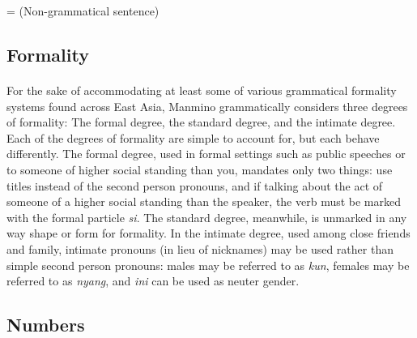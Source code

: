 \documentclass{book}
\begin{document}
        \hspace{.4in}= (Non-grammatical sentence)
        
        \vfill\newpage
        \subsection{Formality}
        \paragraph{} For the sake of accommodating at least some of various grammatical formality systems found across East Asia, Manmino grammatically considers three degrees of formality: The formal degree, the standard degree, and the intimate degree. Each of the degrees of formality are simple to account for, but each behave differently. The formal degree, used in formal settings such as public speeches or to someone of higher social standing than you, mandates only two things: use titles instead of the second person pronouns, and if talking about the act of someone of a higher social standing than the speaker, the verb must be marked with the formal particle \textit{si}. The standard degree, meanwhile, is unmarked in any way shape or form for formality. In the intimate degree, used among close friends and family, intimate pronouns (in lieu of nicknames) may be used rather than simple second person pronouns: males may be referred to as \textit{kun}, females may be referred to as \textit{nyang}, and \textit{ini} can be used as neuter gender.
        \subsection{Numbers}
\end{document}
